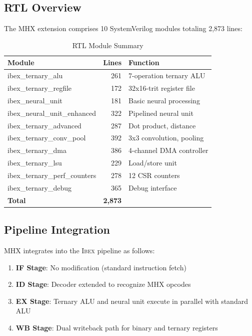 \documentclass[conference,10pt]{IEEEtran}
\newcommand{\mhx}{\textsc{MHX\texttrademark}}
\newcommand{\ibex}{\textsc{Ibex}}
\begin{document}
\subsection{RTL Overview}

The \mhx{} extension comprises 10 SystemVerilog modules totaling 2,873 lines:

\begin{table}[h]
\centering
\caption{RTL Module Summary}
\label{tab:rtl_modules}
\begin{tabular}{|l|r|l|}
\hline
\textbf{Module} & \textbf{Lines} & \textbf{Function} \\
\hline
ibex\_ternary\_alu & 261 & 7-operation ternary ALU \\
ibex\_ternary\_regfile & 172 & 32x16-trit register file \\
ibex\_neural\_unit & 181 & Basic neural processing \\
ibex\_neural\_unit\_enhanced & 322 & Pipelined neural unit \\
ibex\_ternary\_advanced & 287 & Dot product, distance \\
ibex\_ternary\_conv\_pool & 392 & 3x3 convolution, pooling \\
ibex\_ternary\_dma & 386 & 4-channel DMA controller \\
ibex\_ternary\_lsu & 229 & Load/store unit \\
ibex\_ternary\_perf\_counters & 278 & 12 CSR counters \\
ibex\_ternary\_debug & 365 & Debug interface \\
\hline
\textbf{Total} & \textbf{2,873} & \\
\hline
\end{tabular}
\end{table}

\subsection{Pipeline Integration}

\mhx{} integrates into the \ibex{} pipeline as follows:

\begin{enumerate}
    \item \textbf{IF Stage}: No modification (standard instruction fetch)
    \item \textbf{ID Stage}: Decoder extended to recognize \mhx{} opcodes
    \item \textbf{EX Stage}: Ternary ALU and neural unit execute in parallel with standard ALU
    \item \textbf{WB Stage}: Dual writeback path for binary and ternary registers
\end{enumerate}
\end{document}
